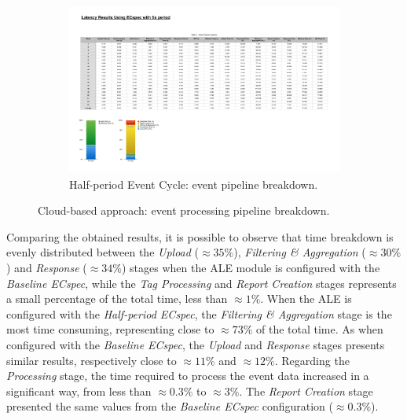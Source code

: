 \begin{figure}[ht!]
\begin{subfigure}{.5\textwidth}
    \includegraphics[height=\linewidth]{./images/cloud_ecspecf_effective_breakdown}
    \caption{Half-period Event Cycle: event pipeline breakdown.}
    \label{fig:ecspecf_effective_half}
  \end{subfigure}
  \caption[Cloud-based approach: event processing breakdown.]{Cloud-based approach: event processing pipeline breakdown.}
  \label{fig:ecspecf_effective_breakdown}
\end{figure}

Comparing the obtained results, it is possible to observe that time breakdown is evenly distributed
between the \textit{Upload} ($\approx35\%$), \textit{Filtering \& Aggregation} ($\approx30\%$) and
\textit{Response} ($\approx34\%$) stages when the \gls{ALE} module is configured with the \textit{Baseline ECspec},
while the \textit{Tag Processing} and \textit{Report Creation} stages represents a small percentage of the
total time, less than $\approx1\%$. When the \gls{ALE} is configured with the \textit{Half-period ECspec},
the \textit{Filtering \& Aggregation} stage is the most time consuming, representing close to $\approx 73\%$
of the total time. As when configured with the \textit{Baseline ECspec}, the \textit{Upload} and
\textit{Response} stages presents similar results, respectively close to $\approx11\%$ and $\approx12\%$.
Regarding the \textit{Processing} stage, the time required to process the event data increased in a significant
way, from less than $\approx0.3\%$ to $\approx3\%$. The \textit{Report Creation} stage presented the same
values from the \textit{Baseline ECspec} configuration ($\approx0.3\%$).\\

